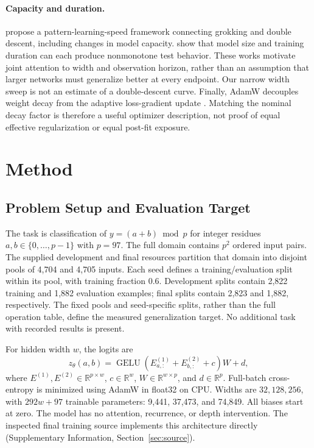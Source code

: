 \documentclass{article}
\begin{document}
\paragraph{Capacity and duration.}
\citet{Davies2023Unifying} propose a pattern-learning-speed framework connecting grokking and double descent, including changes in model capacity. \citet{Nakkiran2020Double} show that model size and training duration can each produce nonmonotone test behavior. These works motivate joint attention to width and observation horizon, rather than an assumption that larger networks must generalize better at every endpoint. Our narrow width sweep is not an estimate of a double-descent curve. Finally, AdamW decouples weight decay from the adaptive loss-gradient update \citep{Loshchilov2019AdamW}. Matching the nominal decay factor is therefore a useful optimizer description, not proof of equal effective regularization or equal post-fit exposure.

\section{Method}
\subsection{Problem Setup and Evaluation Target}
The task is classification of $y=(a+b)\bmod p$ for integer residues $a,b\in\{0,\ldots,p-1\}$ with $p=97$. The full domain contains $p^2$ ordered input pairs. The supplied development and final resources partition that domain into disjoint pools of 4,704 and 4,705 inputs. Each seed defines a training/evaluation split within its pool, with training fraction 0.6. Development splits contain 2,822 training and 1,882 evaluation examples; final splits contain 2,823 and 1,882, respectively. The fixed pools and seed-specific splits, rather than the full operation table, define the measured generalization target. No additional task with recorded results is present.

For hidden width $w$, the logits are
\begin{equation}
 z_\theta(a,b)=\operatorname{GELU}\!\left(E^{(1)}_{a,:}+E^{(2)}_{b,:}+c\right)W+d,
 \label{eq:model}
\end{equation}
where $E^{(1)},E^{(2)}\in\mathbb{R}^{p\times w}$, $c\in\mathbb{R}^{w}$, $W\in\mathbb{R}^{w\times p}$, and $d\in\mathbb{R}^{p}$. Full-batch cross-entropy is minimized using AdamW in float32 on CPU. Widths are $32,128,256$, with $292w+97$ trainable parameters: 9,441, 37,473, and 74,849. All biases start at zero. The model has no attention, recurrence, or depth intervention. The inspected final training source implements this architecture directly (Supplementary Information, Section~\ref{sec:source}).
\end{document}
